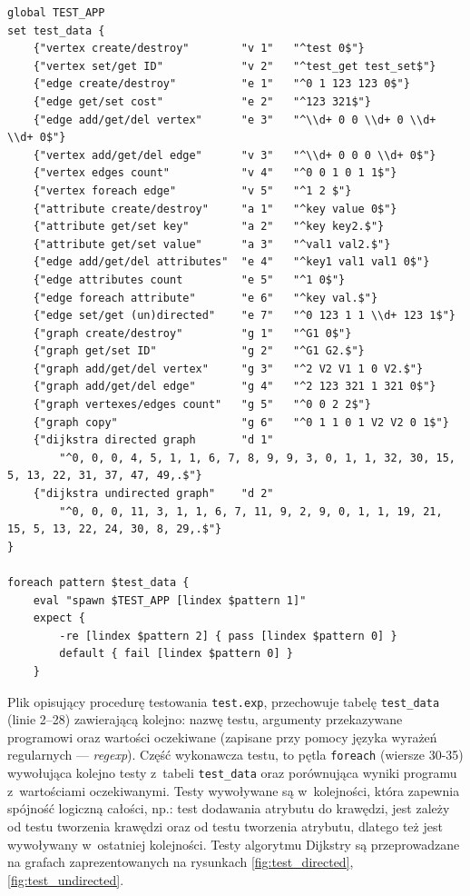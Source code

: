 \documentclass[a4paper,12pt,polish,twoside,openright]{thesis}
\newcommand\code[1]{\lstinline[style=line]{#1}}
\begin{document}
\begin{lstlisting}[style=code,caption=Plik definicji testów jednostkowych platformy DejaGNU]
global TEST_APP
set test_data {
	{"vertex create/destroy"        "v 1"   "^test 0$"}
	{"vertex set/get ID"            "v 2"   "^test_get test_set$"}
	{"edge create/destroy"          "e 1"   "^0 1 123 123 0$"}
	{"edge get/set cost"            "e 2"   "^123 321$"}
	{"edge add/get/del vertex"      "e 3"   "^\\d+ 0 0 \\d+ 0 \\d+ \\d+ 0$"}
	{"vertex add/get/del edge"      "v 3"   "^\\d+ 0 0 0 \\d+ 0$"}
	{"vertex edges count"           "v 4"   "^0 0 1 0 1 1$"}
	{"vertex foreach edge"          "v 5"   "^1 2 $"}
	{"attribute create/destroy"     "a 1"   "^key value 0$"}
	{"attribute get/set key"        "a 2"   "^key key2.$"}
	{"attribute get/set value"      "a 3"   "^val1 val2.$"}
	{"edge add/get/del attributes"  "e 4"   "^key1 val1 val1 0$"}
	{"edge attributes count         "e 5"   "^1 0$"}
	{"edge foreach attribute"       "e 6"   "^key val.$"}
	{"edge set/get (un)directed"    "e 7"   "^0 123 1 1 \\d+ 123 1$"}
	{"graph create/destroy"         "g 1"   "^G1 0$"}
	{"graph get/set ID"             "g 2"   "^G1 G2.$"}
	{"graph add/get/del vertex"     "g 3"   "^2 V2 V1 1 0 V2.$"}
	{"graph add/get/del edge"       "g 4"   "^2 123 321 1 321 0$"}
	{"graph vertexes/edges count"   "g 5"   "^0 0 2 2$"}
	{"graph copy"                   "g 6"   "^0 1 1 0 1 V2 V2 0 1$"}
	{"dijkstra directed graph       "d 1"
		"^0, 0, 0, 4, 5, 1, 1, 6, 7, 8, 9, 9, 3, 0, 1, 1, 32, 30, 15, 5, 13, 22, 31, 37, 47, 49,.$"}
	{"dijkstra undirected graph"    "d 2"
		"^0, 0, 0, 11, 3, 1, 1, 6, 7, 11, 9, 2, 9, 0, 1, 1, 19, 21, 15, 5, 13, 22, 24, 30, 8, 29,.$"}
}

foreach pattern $test_data {
	eval "spawn $TEST_APP [lindex $pattern 1]"
	expect {
		-re [lindex $pattern 2] { pass [lindex $pattern 0] }
		default { fail [lindex $pattern 0] }
	}
\end{lstlisting}
Plik opisujący procedurę testowania \code{test.exp}, przechowuje tabelę \code{test_data} (linie 2--28) zawierającą kolejno: nazwę testu, argumenty przekazywane programowi oraz wartości oczekiwane (zapisane przy pomocy języka wyrażeń regularnych --- \emph{regexp}).
Część wykonawcza testu, to pętla \code{foreach} (wiersze 30-35) wywołująca kolejno testy z~tabeli \code{test_data} oraz porównująca wyniki programu z~wartościami oczekiwanymi.
Testy wywoływane są w~kolejności, która zapewnia spójność logiczną całości, np.: test dodawania atrybutu do krawędzi, jest zależy od testu tworzenia krawędzi oraz od testu tworzenia atrybutu, dlatego też jest wywoływany w~ostatniej kolejności.
Testy algorytmu Dijkstry są przeprowadzane na grafach zaprezentowanych na rysunkach \ref{fig:test_directed}, \ref{fig:test_undirected}.
\end{document}
